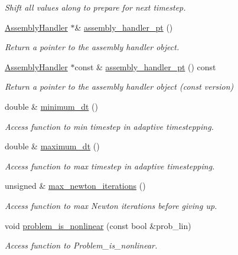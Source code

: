 \begin{DoxyCompactItemize}
\begin{DoxyCompactList}\small\item\em Shift all values along to prepare for next timestep. \end{DoxyCompactList}\item 
\hyperlink{classoomph_1_1AssemblyHandler}{Assembly\+Handler} $\ast$\& \hyperlink{classoomph_1_1Problem_a2edfe33241276bdba87927aacead3099}{assembly\+\_\+handler\+\_\+pt} ()
\begin{DoxyCompactList}\small\item\em Return a pointer to the assembly handler object. \end{DoxyCompactList}\item 
\hyperlink{classoomph_1_1AssemblyHandler}{Assembly\+Handler} $\ast$const  \& \hyperlink{classoomph_1_1Problem_a48905dc6c9a8811969407939b3e4ccb6}{assembly\+\_\+handler\+\_\+pt} () const
\begin{DoxyCompactList}\small\item\em Return a pointer to the assembly handler object (const version) \end{DoxyCompactList}\item 
double \& \hyperlink{classoomph_1_1Problem_adffc8921bf61edac68ed017bcdc1d792}{minimum\+\_\+dt} ()
\begin{DoxyCompactList}\small\item\em Access function to min timestep in adaptive timestepping. \end{DoxyCompactList}\item 
double \& \hyperlink{classoomph_1_1Problem_ac5355154d4991ec634e74d4817176f5f}{maximum\+\_\+dt} ()
\begin{DoxyCompactList}\small\item\em Access function to max timestep in adaptive timestepping. \end{DoxyCompactList}\item 
unsigned \& \hyperlink{classoomph_1_1Problem_aa30b2e89f61a327ffb1be4ff30bb868f}{max\+\_\+newton\+\_\+iterations} ()
\begin{DoxyCompactList}\small\item\em Access function to max Newton iterations before giving up. \end{DoxyCompactList}\item 
void \hyperlink{classoomph_1_1Problem_a92acc3c193a38f321fc318fafd142f7a}{problem\+\_\+is\+\_\+nonlinear} (const bool \&prob\+\_\+lin)
\begin{DoxyCompactList}\small\item\em Access function to Problem\+\_\+is\+\_\+nonlinear. \end{DoxyCompactList}\item 

\end{DoxyCompactItemize}
